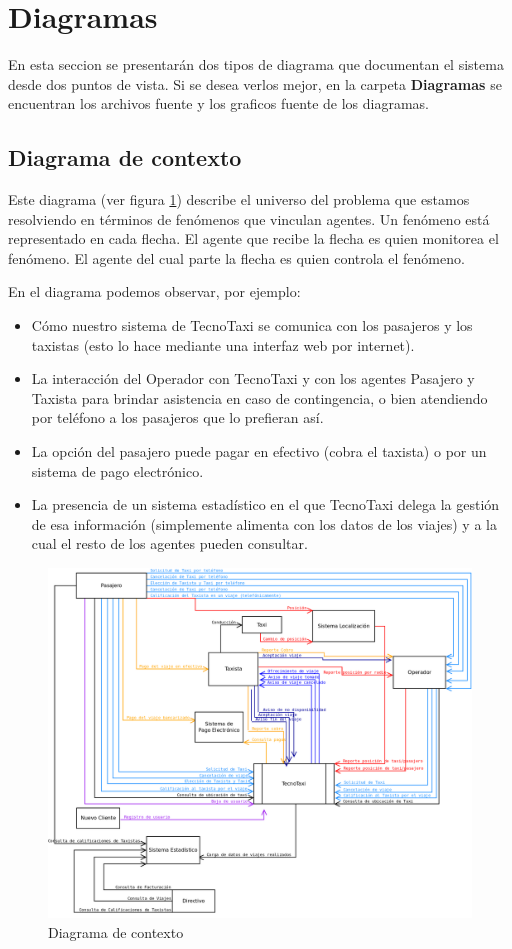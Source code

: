 \section{Diagramas}
En esta seccion se presentar\'an dos tipos de diagrama que documentan el sistema desde dos puntos de vista. Si se desea verlos mejor, en la carpeta \textbf{Diagramas} se encuentran los archivos fuente y los graficos fuente de los diagramas.

\subsection{Diagrama de contexto}
Este diagrama (ver figura \ref{diag:contexto}) describe el universo del problema que estamos resolviendo en términos de fenómenos que vinculan agentes. Un fenómeno está representado en cada flecha. El agente que recibe la flecha es quien monitorea el fenómeno. El agente del cual parte la flecha es quien controla el fenómeno.
\par
En el diagrama podemos observar, por ejemplo:
\begin{itemize}
 \item Cómo nuestro sistema de TecnoTaxi se comunica con los pasajeros y los taxistas (esto lo hace mediante una interfaz web por internet). 
 \item La interacción del Operador con TecnoTaxi y con los agentes Pasajero y Taxista para brindar asistencia en caso de contingencia, o bien atendiendo por teléfono a los pasajeros que lo prefieran así.
 \item La opción del pasajero puede pagar en efectivo (cobra el taxista) o por un sistema de pago electrónico.
 \item La presencia de un sistema estadístico en el que TecnoTaxi delega la gestión de esa información (simplemente alimenta con los datos de los viajes) y a la cual el resto de los agentes pueden consultar.
\end{itemize}
\begin{figure}[h!]
  \centering    
    \includegraphics[scale=0.33]{diagramas/contexto/contextoAmpliado3.png}
  \caption{Diagrama de contexto}
\label{diag:contexto}
\end{figure}

